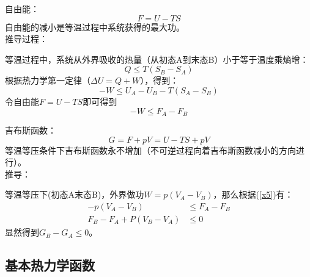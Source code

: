\documentclass[12pt]{article}
\begin{document}
\noindent
自由能：
\begin{equation}
	F=U-TS
\end{equation}
自由能的减小是等温过程中系统获得的最大功。
\\推导过程：
\par 等温过程中，系统从外界吸收的热量（从初态A到末态B）小于等于温度乘熵增：
\begin{equation}
	Q\le T(S_B-S_A)
\end{equation}
根据热力学第一定律（$\Delta U=Q+W$），得到：
\begin{equation}
	-W \le U_A-U_B-T(S_A-S_B)
\end{equation}
令自由能$F=U-TS$即可得到
\begin{equation}
	-W\le F_A-F_B
\label{x5}
\end{equation}


\noindent 吉布斯函数：
\begin{equation}
	G=F+pV=U-TS+pV
\end{equation}
等温等压条件下吉布斯函数永不增加（不可逆过程向着吉布斯函数减小的方向进行）。\\
推导：

等温等压下(初态A末态B)，外界做功$W=p(V_A-V_B)$，那么根据(\ref{x5})有：
\begin{equation}
	\begin{split}
	-p(V_A-V_B)&\le F_A-F_B\\
 F_B-F_A+P(V_B-V_A)&\le 0
\end{split}
\end{equation}
显然得到$G_B-G_A\le 0$。

\newpage
\subsection{基本热力学函数}
\end{document}
